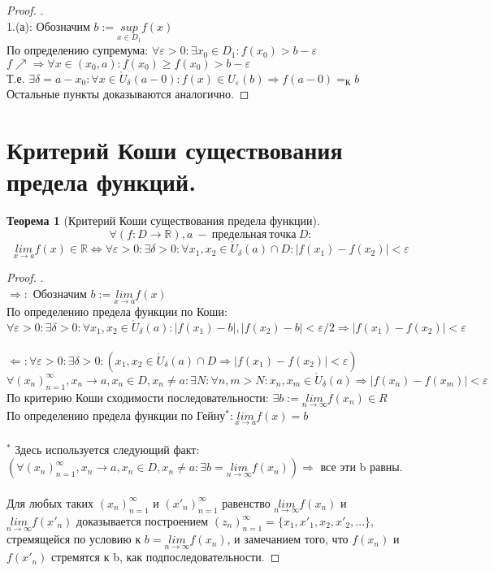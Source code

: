 \documentclass[11pt,a4paper,titlepage]{article}
\newtheorem*{theorem}{Теорема}
\renewcommand{\lim}[2]{\underset{#1 \rightarrow #2}{lim}}
\renewcommand{\sup}[1]{\underset{#1}{sup}}
\newcommand{\limn}{\lim{n}{\infty}}
\renewcommand{\implies}{\Rightarrow}
\newcommand{\bimplies}{\Leftarrow}
\renewcommand{\iff}{\Leftrightarrow}
\renewcommand{\epsilon}{\varepsilon}
\newcommand{\R}{\mathbb{R}}
\renewcommand{\U}{\mathring{U}}
\begin{document}
    \begin{proof}
        .\\
        1.(а): Обозначим $b := \sup{x\in D_1}f(x)$\\
        По определению супремума: $\forall \epsilon > 0: \exists x_0\in D_1: f(x_0) > b - \epsilon$\\
        $f\nearrow \implies \forall x \in (x_0, a): f(x_0) \geq f(x_0) > b - \epsilon$\\
        Т.е. $\exists \delta = a - x_0: \forall x \in \U_\delta(a-0): f(x) \in U_\epsilon(b) \implies f(a-0) =_К b$\\
        Остальные пункты доказываются аналогично.
    \end{proof}


    \section{Критерий Коши существования предела функций.}

    \begin{theorem}[Критерий Коши существования предела функции]
        \[\forall (f: D \to \R), a\ -\ предельная\ точка\ D:\]
        \[\lim{x}{a} f(x) \in \R \iff \forall \epsilon > 0: \exists \delta > 0: \forall x_1, x_2 \in \U_\delta(a) \cap D: |f(x_1) - f(x_2)| < \epsilon\]
    \end{theorem}

    \begin{proof}
        .\\
        $\implies:$ Обозначим $b := \lim{x}{a}f(x)$\\
        По определению предела функции по Коши: $\forall \epsilon > 0: \exists \delta > 0: \forall x_1, x_2 \in \U_\delta(a): |f(x_1) - b|, |f(x_2) - b| < \epsilon/2 \implies |f(x_1) - f(x_2)| < \epsilon$\\\\
        $\bimplies: \forall \epsilon > 0: \exists \delta > 0: (x_1, x_2 \in \U_\delta(a) \cap D \implies |f(x_1) - f(x_2)| < \epsilon)$\\
        $\forall (x_n)_{n=1}^\infty, x_n \to a, x_n \in D, x_n \neq a: \exists N: \forall n, m > N: x_n, x_m \in \U_\delta(a) \implies |f(x_n) - f(x_m)| < \epsilon$\\
        По критерию Коши сходимости последовательности: $\exists b := \limn f(x_n) \in R$\\
        По определению предела функции по Гейну$^*: \lim{x}{a}f(x) = b$\\\\

        $^*$ Здесь используется следующий факт:\\
        $(\forall (x_n)_{n=1}^\infty, x_n \to a, x_n \in D, x_n \neq a:
        \exists b = \limn f(x_n)) \implies$ все эти b равны.\\\\
        Для любых таких $(x_n)_{n=1}^\infty$ и $(x'_n)_{n=1}^\infty$ равенство $\limn f(x_n)$ и $\limn f(x'_n)$ доказывается построением $(z_n)_{n=1}^\infty = \{x_1, x'_1, x_2, x'_2, ...\}$, стремящейся по условию к $b = \limn f(x_n)$, и замечанием того, что $f(x_n)$ и $f(x'_n)$ стремятся к b, как подпоследовательности.
    \end{proof}
\end{document}
